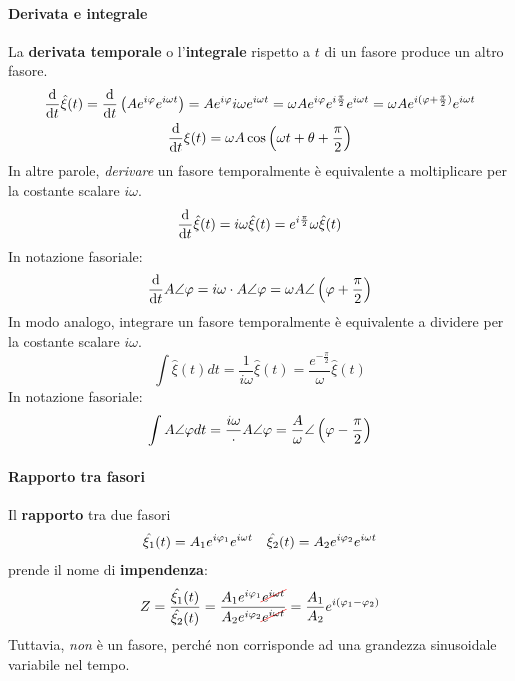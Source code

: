 \paragraph{Derivata e integrale}
La \textbf{derivata temporale} o l'\textbf{integrale} rispetto a $t$ di un fasore produce un altro fasore.
\begin{gather}
	\dv{t} \hat{\xi}(t)=\dv{t}\left(Ae^{i\oldphi}e^{i\omega t}\right)=Ae^{i\oldphi}i\omega e^{i\omega t}=\omega Ae^{i\oldphi}e^{i\frac{\pi}{2}} e^{i\omega t}=\omega Ae^{i(\oldphi+\frac{\pi}{2})}e^{i\omega t}\\
	\dv{t} \xi(t)=\omega A\cos\left(\omega t+\theta+\frac{\pi}{2}\right)
\end{gather}
In altre parole, \textit{derivare} un fasore temporalmente è equivalente a moltiplicare per la costante scalare $i\omega$.
\begin{equation}
	\dv{t} \hat{\xi}(t)=i\omega\hat{\xi}(t)=e^{i\frac{\pi}{2}}\omega\hat{\xi}(t)
\end{equation}
In notazione fasoriale:
\begin{equation}
	\dv{t} A\angle\oldphi=i\omega \cdot A\angle\oldphi=\omega A\angle\left(\oldphi+\frac{\pi}{2}\right)
\end{equation}
In modo analogo, integrare un fasore temporalmente è equivalente a dividere per la costante scalare $i\omega$.
\begin{equation}
	\int \hat{\xi}(t) dt=\frac{1}{i\omega}\hat{\xi}(t)=\frac{e^{-\frac{\pi}{2}}}{\omega}\hat{\xi}(t)
\end{equation}
In notazione fasoriale:
\begin{equation}
	\int A\angle\oldphi dt=\frac{i\omega} \cdot A\angle\oldphi=\frac{A}{\omega}\angle\left(\oldphi-\frac{\pi}{2}\right)
\end{equation}
\paragraph{Rapporto tra fasori}
Il \textbf{rapporto} tra due fasori
\begin{align*}
	\hat{\xi_1}(t)=A_1e^{i\oldphi_1}e^{i\omega t}&&\hat{\xi_2}(t)=A_2e^{i\oldphi_2}e^{i\omega t}
\end{align*}
prende il nome di \textbf{impendenza}:
\begin{equation}
	 Z=\frac{\hat{\xi_1}(t)}{\hat{\xi_2}(t)}=\frac{A_1e^{i\oldphi_1}\Ccancel[red]{e^{i\omega t}}}{A_2e^{i\oldphi_2}\Ccancel[red]{e^{i\omega t}}}=\frac{A_1}{A_2}e^{i(\oldphi_1-\oldphi_2)}
\end{equation}
Tuttavia, \textit{non} è un fasore, perché non corrisponde ad una grandezza sinusoidale variabile nel tempo.